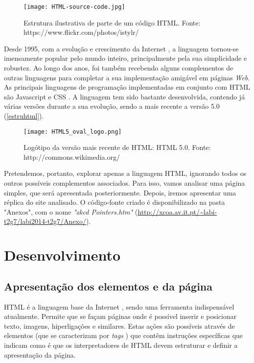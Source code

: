 \documentclass[11pt,openright,twoside]{report}
\begin{document}
\begin{figure}
 \center
 \texttt{[image: HTML-source-code.jpg]}
 \caption{Estrutura ilustrativa de parte de um código HTML. Fonte: https://www.flickr.com/photos/istylr/}
 \label{estruhtml}
\end{figure}

Desde 1995, com a evolução e crescimento da Internet \cite{Internetus}, a linguagem tornou-se imensamente popular pelo mundo inteiro, principalmente pela sua simplicidade e robustez. Ao longo dos anos, foi também recebendo alguns complementos de outras linguagens para completar a sua implementação amigável em páginas \textit{Web}. As principais linguagens de programação implementadas em conjunto com HTML são Javascript \cite{Javascript} e CSS \cite{Css}. A linguagem tem sido bastante desenvolvida, contendo já várias versões durante a sua evolução, sendo a mais recente a versão 5.0 \citep{w3c} (\autoref{estruhtml}).
\smallskip 

\begin{figure}
 \center
 \texttt{[image: HTML5\_oval\_logo.png]}
 \caption{Logótipo da versão mais recente de HTML: HTML 5.0. Fonte: http://commons.wikimedia.org/}
 \label{estruhtml}
\end{figure}

Pretendemos, portanto, explorar apenas a linguagem HTML, ignorando todos os outros possíveis complementos associados. Para isso, vamos analisar uma página simples, que será apresentada posteriormente. Depois, iremos apresentar uma réplica do site analisado. O código-fonte criado é disponibilizado na pasta "Anexos", com o nome \textit{"xkcd Pointers.htm"} (\url{http://xcoa.av.it.pt/~labi-t2g7/labi2014-t2g7/Anexo/}).

\part{Desenvolvimento}

\chapter{Apresentação dos elementos e da página}
HTML é a linguagem base da Internet \cite{Internetus}, sendo uma ferramenta indispensável atualmente. Permite que se façam páginas onde é possível inserir e posicionar texto, imagens, hiperligações e similares. Estas ações são possíveis através de elementos (que se caracterizam por \textit{tags} \cite{Tag}) que contêm instruções específicas que indicam como é que os interpretadores de HTML devem estruturar e definir a apresentação da página.
\smallskip 
\end{document}
